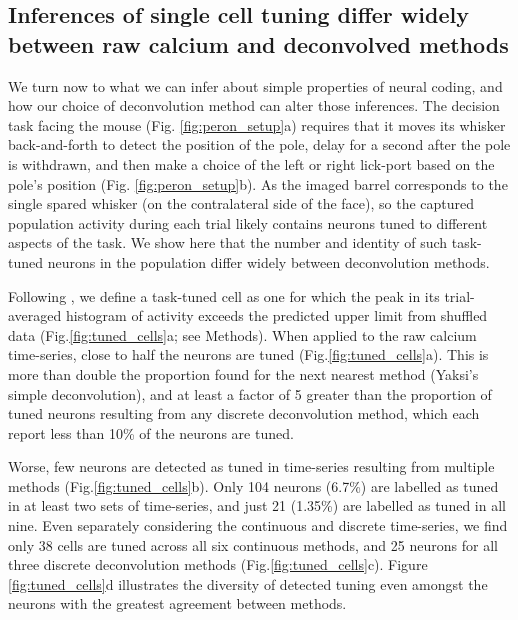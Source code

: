 \documentclass[a4paper,11pt]{article}
\begin{document}
\subsection{Inferences of single cell tuning differ widely between raw calcium and deconvolved methods}
We turn now to what we can infer about simple properties of neural coding, and how our choice of deconvolution method can alter those inferences. The decision task facing the mouse (Fig. \ref{fig:peron_setup}a) requires that it moves its whisker back-and-forth to detect the position of the pole, delay for a second after the pole is withdrawn, and then make a choice of the left or right lick-port based on the pole's position (Fig. \ref{fig:peron_setup}b). As the imaged barrel corresponds to the single spared whisker (on the contralateral side of the face), so the captured population activity during each trial likely contains neurons tuned to different aspects of the task. We show here that the number and identity of such task-tuned neurons in the population differ widely between deconvolution methods. 

Following \citealt{Peron2015-qz}, we define a task-tuned cell as one for which the peak in its trial-averaged histogram of activity exceeds the predicted upper limit from shuffled data (Fig.\ref{fig:tuned_cells}a; see Methods). When applied to the raw calcium time-series, close to half the neurons are tuned (Fig.\ref{fig:tuned_cells}a). This is more than double the proportion found for the next nearest method (Yaksi's simple deconvolution), and at least a factor of 5 greater than the proportion of tuned neurons resulting from any discrete deconvolution method, which each report less than 10\% of the neurons are tuned. 

Worse, few neurons are detected as tuned in time-series resulting from multiple methods (Fig.\ref{fig:tuned_cells}b). Only 104 neurons (6.7\%) are labelled as tuned in at least two sets of time-series, and just 21 (1.35\%) are labelled as tuned in all nine. Even separately considering the continuous and discrete time-series, we find only 38 cells are tuned across all six continuous methods, and 25 neurons for all three discrete deconvolution methods (Fig.\ref{fig:tuned_cells}c). Figure \ref{fig:tuned_cells}d illustrates the diversity of detected tuning even amongst the neurons with the greatest agreement between methods.
\end{document}

